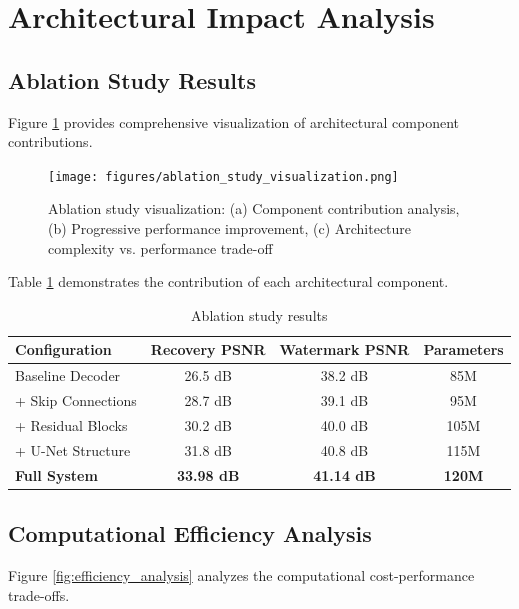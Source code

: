 \documentclass[12pt,a4paper]{report}
\begin{document}
\section{Architectural Impact Analysis}

\subsection{Ablation Study Results}

Figure \ref{fig:ablation_visualization} provides comprehensive visualization of architectural component contributions.

\begin{figure}[H]
    \centering
    \texttt{[image: figures/ablation\_study\_visualization.png]}
    \caption{Ablation study visualization: (a) Component contribution analysis, (b) Progressive performance improvement, (c) Architecture complexity vs. performance trade-off}
    \label{fig:ablation_visualization}
\end{figure}

Table \ref{tab:ablation_study} demonstrates the contribution of each architectural component.

\begin{table}[H]
    \centering
    \caption{Ablation study results}
    \label{tab:ablation_study}
    \begin{tabular}{@{}lccc@{}}
        \toprule
        Configuration & Recovery PSNR & Watermark PSNR & Parameters \\
        \midrule
        Baseline Decoder & 26.5 dB & 38.2 dB & 85M \\
        + Skip Connections & 28.7 dB & 39.1 dB & 95M \\
        + Residual Blocks & 30.2 dB & 40.0 dB & 105M \\
        + U-Net Structure & 31.8 dB & 40.8 dB & 115M \\
        \textbf{Full System} & \textbf{33.98 dB} & \textbf{41.14 dB} & \textbf{120M} \\
        \bottomrule
    \end{tabular}
\end{table}

\subsection{Computational Efficiency Analysis}

Figure \ref{fig:efficiency_analysis} analyzes the computational cost-performance trade-offs.
\end{document}
